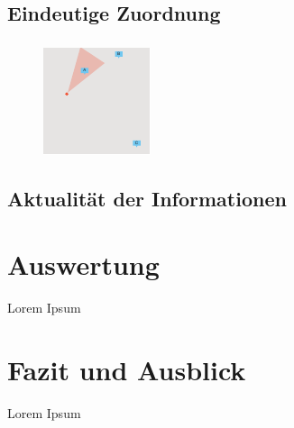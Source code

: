 \documentclass{beamer}
\begin{document}
\subsection{Eindeutige Zuordnung}
\begin{frame}
    \frametitle{\insertsubsection}
    \begin{figure}
        \centering
        \includegraphics[width=.6\linewidth]{images/billboard_identification_1}
    \end{figure}
\end{frame}

\subsection{Aktualität der Informationen}
\begin{frame}
    \frametitle{\insertsubsection}
    
\end{frame}

\section{Auswertung}
\begin{frame}
    Lorem Ipsum
\end{frame}

\section{Fazit und Ausblick}
\begin{frame}
    Lorem Ipsum
\end{frame}
\end{document}
